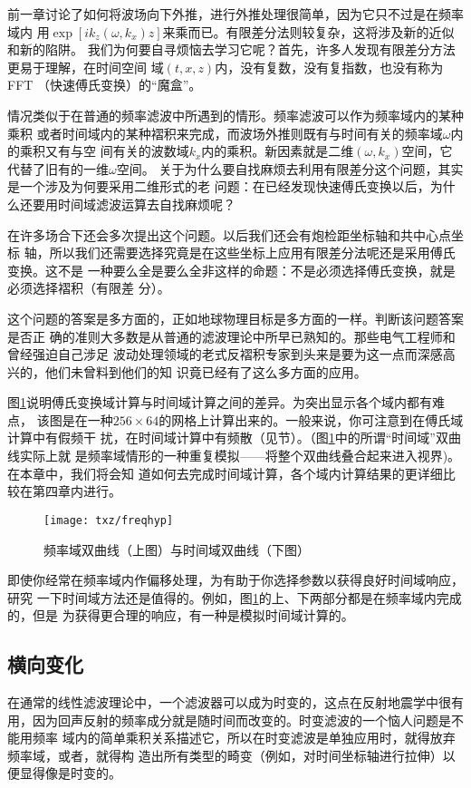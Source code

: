 前一章讨论了如何将波场向下外推，进行外推处理很简单，因为它只不过是在频率域内
用$\exp[ik_z(\omega,k_x)z]$来乘而已。有限差分法则较复杂，这将涉及新的近似和新的陷阱。
我们为何要自寻烦恼去学习它呢？首先，许多人发现有限差分方法更易于理解，在时间空间
域$(t,x,z)$内，没有复数，没有复指数，也没有称为FFT
（快速傅氏变换）的“魔盒”。

情况类似于在普通的频率滤波中所遇到的情形。频率滤波可以作为频率域内的某种乘积
或者时间域内的某种褶积来完成，而波场外推则既有与时间有关的频率域$\omega$内的乘积又有与空
间有关的波数域$k_x$内的乘积。新因素就是二维$(\omega,k_x)$空间，它代替了旧有的一维$\omega$空间。
关于为什么要自找麻烦去利用有限差分这个问题，其实是一个涉及为何要采用二维形式的老
问题：在已经发现快速傅氏变换以后，为什么还要用时间域滤波运算去自找麻烦呢？

在许多场合下还会多次提出这个问题。以后我们还会有炮检距坐标轴和共中心点坐标
轴，所以我们还需要选择究竟是在这些坐标上应用有限差分法呢还是采用傅氏变换。这不是
一种要么全是要么全非这样的命题：不是必须选择傅氏变换，就是必须选择褶积（有限差
分）。

这个问题的答案是多方面的，正如地球物理目标是多方面的一样。判断该问题答案是否正
确的准则大多数是从普通的滤波理论中所早已熟知的。那些电气工程师和曾经强迫自己涉足
波动处理领域的老式反褶积专家到头来是要为这一点而深感高兴的，他们未曾料到他们的知
识竟已经有了这么多方面的应用。

图\ref{fig:txz/freqhyp}说明傅氏变换域计算与时间域计算之间的差异。为突出显示各个域内都有难点，
该图是在一种$256\times64$的网格上计算出来的。一般来说，你可注意到在傅氏域计算中有假频干
扰，在时间域计算中有频散（见\label{sec:4.3}节）。（图\ref{fig:txz/freqhyp}中的所谓“时间域”双曲线实际上就
是频率域情形的一种重复模拟——将整个双曲线叠合起来进入视界)。在本章中，我们将会知
道如何去完成时间域计算，各个域内计算结果的更详细比较在第四章内进行。
\begin{figure}[H]
\centering
\texttt{[image: txz/freqhyp]}
\caption[freqhyp]{频率域双曲线（上图）与时间域双曲线（下图）}
\label{fig:txz/freqhyp}
\end{figure}

即使你经常在频率域内作偏移处理，为有助于你选择参数以获得良好时间域响应，研究
一下时间域方法还是值得的。例如，图\ref{fig:txz/freqhyp}的上、下两部分都是在频率域内完成的，但是
为获得更合理的响应，有一种是模拟时间域计算的。
\subsection{横向变化}
在通常的线性滤波理论中，一个滤波器可以成为时变的，这点在反射地震学中很有
用，因为回声反射的频率成分就是随时间而改变的。时变滤波的一个恼人问题是不能用频率
域内的简单乘积关系描述它，所以在时变滤波是单独应用时，就得放弃频率域，或者，就得构
造出所有类型的畸变（例如，对时间坐标轴进行拉伸）以便显得像是时变的。

